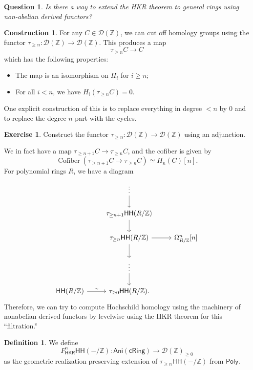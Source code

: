 \documentclass[10pt, oneside]{memoir}
\newtheorem{quest}[thm]{Question}
\theoremstyle{definition}
\newtheorem{defn}[thm]{Definition}
\newtheorem{con}[thm]{Construction}
\newtheorem{exer}[thm]{Exercise}
\theoremstyle{remark}
\theoremstyle{plain}
\theoremstyle{definition}
\theoremstyle{remark}
\newcommand{\Z}{\mathbb{Z}}
\newcommand{\mc}[1]{\mathcal{#1}}
\newcommand{\on}[1]{\operatorname{#1}}
\newcommand{\ms}[1]{\mathsf{#1}}
\newcommand{\1}{\mathbf{1}}
\newcommand{\2}{\mathbf{2}}
\newcommand{\3}{\mathbf{3}}
\newcommand{\HH}{\ms{HH}}
\begin{document}
\begin{quest}
    Is there a way to extend the HKR theorem to general rings using non-abelian derived functors?
\end{quest}

\begin{con}
    For any \(C \in \mc{D}(\Z) \), we can cut off homology groups using the functor \(\tau_{\geq n} \colon \mc{D}(\Z) \to \mc{D}(\Z) \). This produces a map
    \[ \tau_{\geq n} C \to C \]
    which has the following properties:
    \begin{itemize}
        \item The map is an isomorphism on \(H_i \) for \(i \geq n \);
        \item For all \(i < n \), we have \(H_i(\tau_{\geq n} C) = 0 \).
    \end{itemize}
    One explicit construction of this is to replace everything in degree \(<n \) by \(0 \) and to replace the degree \(n \) part with the cycles.
\end{con}

\begin{exer}
    Construct the functor \(\tau_{\geq n} \colon \mc{D}(\Z) \to \mc{D}(\Z) \) using an adjunction.
\end{exer}
We in fact have a map \(\tau_{\geq n+1} C \to \tau_{\geq n} C \), and the cofiber is given by
\[ \on{Cofiber}(\tau_{\geq n+1} C \to \tau_{\geq n} C) \simeq H_n(C) [n]. \]
For polynomial rings \(R \), we have a diagram
\begin{equation*}
\begin{tikzcd}
    & \vdots \ar{d} \\
    & \tau_{\geq n+1} \HH(R/\Z) \ar{d} \\
    & \tau_{\geq n} \HH(R/\Z) \ar{d} \ar{r} & \Omega^n_{R/\Z}[n] \\
    & \vdots \ar{d} & \\
    \HH(R/\Z) \ar{r}{\sim} & \tau_{\geq 0} \HH(R/\Z).
\end{tikzcd}
\end{equation*}
Therefore, we can try to compute Hochschild homology using the machinery of nonabelian derived functors by levelwise using the HKR theorem for this ``filtration.''

\begin{defn}
    We define
    \[ F^n_{\ms{HKR}} \HH(-/\Z) \colon \ms{Ani}(\ms{cRing}) \to \mc{D}(\Z)_{\geq 0} \]
    as the geometric realization preserving extension of \(\tau_{\geq n} \HH(-/\Z) \) from \(\ms{Poly} \).
\end{defn}
\end{document}
